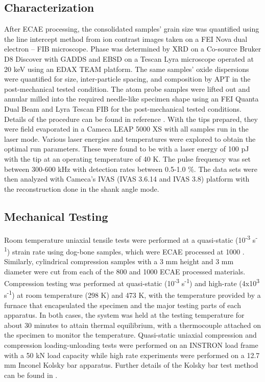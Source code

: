 	\subsection*{Characterization}
		After ECAE processing, the consolidated samples’ grain size was quantified using the line intercept method from ion contrast images taken on a FEI Nova dual electron – FIB microscope. Phase was determined by XRD on a Co-source Bruker D8 Discover with GADDS and EBSD on a Tescan Lyra microscope operated at 20 keV using an EDAX TEAM platform. The same samples’ oxide dispersions were quantified for size, inter-particle spacing, and composition by APT in the post-mechanical tested condition. The atom probe samples were lifted out and annular milled into the required needle-like specimen shape using an FEI Quanta Dual Beam and Lyra Tescan FIB for the post-mechanical tested conditions. Details of the procedure can be found in reference \cite{RN347}. With the tips prepared, they were field evaporated in a Cameca LEAP 5000 XS with all samples run in the laser mode. Various laser energies and temperatures were explored to obtain the optimal run parameters. These were found to be with a laser energy of 100 pJ with the tip at an operating temperature of 40 K. The pulse frequency was set between 300-600 kHz with detection rates between 0.5-1.0 \%. The data sets were then analyzed with Cameca’s IVAS (IVAS 3.6.14 and IVAS 3.8) platform with the reconstruction done in the shank angle mode.

	\subsection*{Mechanical Testing}
		Room temperature uniaxial tensile tests were performed at a quasi-static (10\textsuperscript{-3} s\textsuperscript{-1}) strain rate using dog-bone samples, which were ECAE processed at 1000 \celsius{}. Similarly, cylindrical compression samples with a 3 mm height and 3 mm diameter were cut from each of the 800 \celsius{} and 1000 \celsius{} ECAE processed materials. Compression testing was performed at quasi-static (10\textsuperscript{-3} s\textsuperscript{-1}) and high-rate (4x10\textsuperscript{3} s\textsuperscript{-1}) at room temperature (298 K) and 473 K, with the temperature provided by a furnace that encapsulated the specimen and the major testing parts of each apparatus. In both cases, the system was held at the testing temperature for about 30 minutes to attain thermal equilibrium, with a thermocouple attached on the specimen to monitor the temperature. Quasi-static uniaxial compression and compression loading-unloading tests were performed on an INSTRON load frame with a 50 kN load capacity while high rate experiments were performed on a 12.7 mm Inconel Kolsky bar \cite{RN1012,RN1053} apparatus. Further details of the Kolsky bar test method can be found in \cite{RN1121}. 

